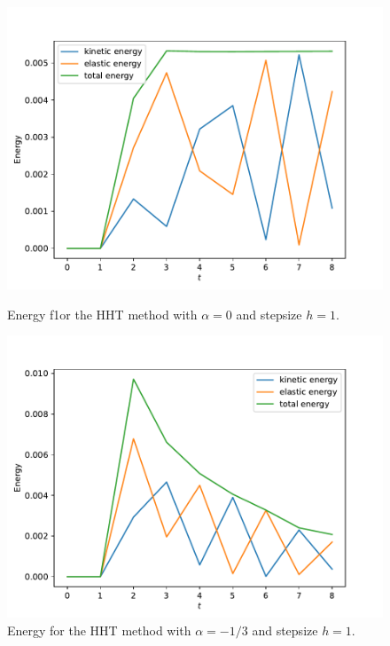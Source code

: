 \documentclass{report}
\begin{document}
\begin{figure}[h]
\centering
\begin{minipage}[t]{0.45\textwidth}
\centering
\includegraphics[width=\textwidth]{../Plots/Project3_main/Figure_900.pdf}
\caption{Energy f1or the HHT method with $\alpha=0$ and stepsize $h=1$.}
\label{pl:beam_exp_HHTalpha_0}
\end{minipage}
\hfill
\begin{minipage}[t]{0.45\textwidth}
\centering
\includegraphics[width=\textwidth]{../Plots/Project3_main/Figure_901.pdf}
\caption{Energy for the HHT method with $\alpha=-1/3$ and stepsize $h=1$.}
\label{pl:beam_exp_HHTalpha_minimal}
\end{minipage}
\end{figure}
\end{document}
